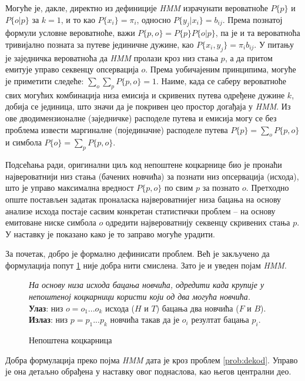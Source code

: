 \documentclass[12pt,oneside]{memoir}
\newenvironment{problem}[1][!ht]
{\renewcommand{\algorithmcfname}{Проблем}
\begin{figure}[!ht]
\centering
  \begin{minipage}{.94\linewidth}
	\begin{algorithm}[#1]%
  }{\end{algorithm}
  \end{minipage}
\end{figure}}
\begin{document}
\begin{CJK}{UTF8}{ipxm}
Могуће је, дакле, директно из дефиниције \textit{HMM} израчунати вероватноће  $P\{p\}$ и $P\{o | p\}$ за $k = 1$, и то као $P\{x_i\} = \pi_i$, односно $P\{y_j | x_i\} = b_{ij}$. Према познатој формули условне вероватноће, важи $P\{p, o\} = P\{p\} P\{o | p\}$, па је и та вероватноћа тривијално позната за путеве јединичне дужине, као $P\{x_i, y_j\} = \pi_i b_{ij}$. У питању је заједничка вероватноћа да \textit{HMM} пролази кроз низ стања $p$, а да притом емитује управо секвенцу опсервација $o$. Према уобичајеним принципима, могуће је приметити следеће: $\sum_o \sum_p P\{p, o\} = 1$. Наиме, када се саберу вероватноће свих могућих комбинација низа емисија и скривених путева одређене дужине $k$, добија се јединица, што значи да је покривен цео простор догађаја у \textit{HMM}. Из ове дводимензионалне (заједничке) расподеле путева и емисија могу се без проблема извести маргиналне (појединачне) расподеле путева $P\{p\} = \sum_o P\{p, o\}$ и симбола $P\{o\} = \sum_p P\{p, o\}$.

Подсећања ради, оригинални циљ код непоштене коцкарнице био је пронаћи највероватнији низ стања (бачених новчића) за познати низ опсервација (исхода), што је управо максимална вредност $P\{p, o\}$ по свим $p$ за познато $o$. Претходно опште постављен задатак проналаска највероватнијег низа бацања на основу анализе исхода постаје сасвим конкретан статистички проблем -- на основу емитоване ниске симбола $o$ одредити највероватнију секвенцу скривених стања $p$. У наставку је показано како је то заправо могуће урадити.

За почетак, добро је формално дефинисати проблем. Већ је закључено да формулација попут \ref{prob:kock} није добра нити смислена. Зато је и уведен појам \textit{HMM}.

\begin{problem}[H]
  \SetAlgoLined
  \textit{На основу низа исхода бацања новчића, одредити када крупије у непоштеној коцкарници користи који од два могућа новчића.}\\
  \textbf{Улаз}: низ $o = o_1...o_k$ исхода ($H$ и $T$) бацања два новчића ($F$ и $B$).\\
  \textbf{Излаз}: низ $p = p_1...p_k$ новчића такав да је $o_i$ резултат бацања $p_i$.
  \caption{Непоштена коцкарница}
  \label{prob:kock}
\end{problem}

Добра формулација преко појма \textit{HMM} дата је кроз проблем \ref{prob:dekod}. Управо је она детаљно обрађена у наставку овог поднаслова, као његов централни део.


\end{CJK}
\end{document}
